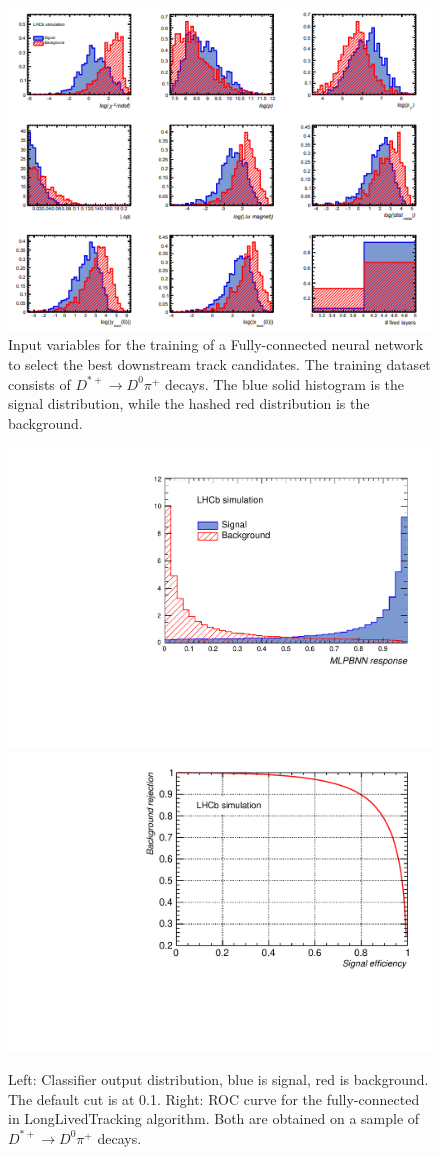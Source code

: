 \begin{figure}[!htbp]
\begin{center}
\includegraphics[width=0.99\linewidth]{figures/NN/input_mva.PNG}
\caption{Input variables for the training of a Fully-connected neural network to select the best downstream track candidates. The training dataset consists of
 $D^{*+} \rightarrow D^{0}\pi^{+}$ decays. The blue solid histogram is the signal
distribution, while the hashed red distribution is the background.}
\label{fig:MVAVars}
\end{center}
\end{figure}

\begin{figure}[!htbp]
\begin{center}
\includegraphics[rotate=270, width=0.45\linewidth]{figures/NN/ClassifierOutputDistribution.pdf}
\includegraphics[rotate=270, width=0.45\linewidth]{figures/NN/ROC.pdf}
\caption{Left: Classifier output distribution, blue is signal, red is
background. The default cut is at 0.1. Right: ROC curve for the fully-connected in LongLivedTracking algorithm. Both are obtained on a sample of
 $D^{*+} \rightarrow D^{0}\pi^{+}$  decays.}
\label{fig:ROC}
\end{center}
\end{figure}


